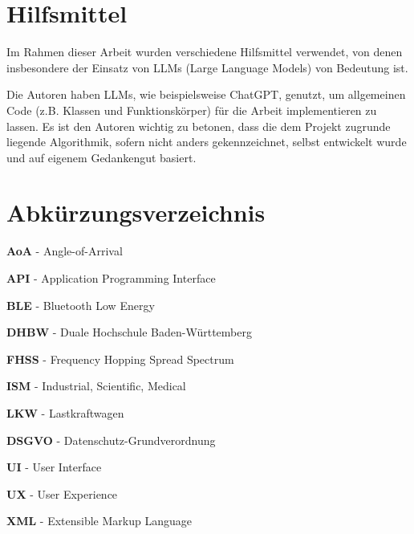 \documentclass[a4paper, 12pt]{article} %
\begin{document}
\section*{Hilfsmittel}
\begin{spacing}{1.8}  %
    \fontsize{14pt}{15pt}\selectfont  %

    Im Rahmen dieser Arbeit wurden verschiedene Hilfsmittel verwendet, von denen
    insbesondere der Einsatz von LLMs (Large Language Models) von Bedeutung ist.
    
    Die Autoren haben LLMs, wie beispielsweise ChatGPT, genutzt, um allgemeinen
    Code (z.B. Klassen und Funktionskörper) für die Arbeit implementieren zu lassen.
    Es ist den Autoren wichtig zu betonen, dass die dem Projekt zugrunde liegende
    Algorithmik, sofern nicht anders gekennzeichnet, selbst entwickelt wurde und auf
    eigenem Gedankengut basiert.

\end{spacing}

\clearpage
\listoffigures

\clearpage

\section*{Abkürzungsverzeichnis}
\begin{spacing}{1.8}  %
    \fontsize{14pt}{15pt}\selectfont  %

   \textbf{AoA}  - Angle-of-Arrival

   \textbf{API} - Application Programming Interface

   \textbf{BLE} - Bluetooth Low Energy

   \textbf{DHBW} - Duale Hochschule Baden-Württemberg

   \textbf{FHSS} - Frequency Hopping Spread Spectrum

   \textbf{ISM} - Industrial, Scientific, Medical

   \textbf{LKW} - Lastkraftwagen

   \textbf{DSGVO} - Datenschutz-Grundverordnung

   \textbf{UI} - User Interface

   \textbf{UX} - User Experience

   \textbf{XML} - Extensible Markup Language


\end{spacing}
\end{document}
